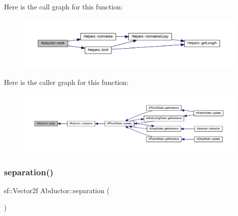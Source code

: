 Here is the call graph for this function\+:
\nopagebreak
\begin{figure}[H]
\begin{center}
\leavevmode
\includegraphics[width=350pt]{class_abductor_a2c5431c2d7afa37f9f083762eff5a995_cgraph}
\end{center}
\end{figure}
Here is the caller graph for this function\+:
\nopagebreak
\begin{figure}[H]
\begin{center}
\leavevmode
\includegraphics[width=350pt]{class_abductor_a2c5431c2d7afa37f9f083762eff5a995_icgraph}
\end{center}
\end{figure}
\mbox{\label{class_abductor_aac2bef46d63d3aa630a34ee1cb23a7f6}} 
\subsubsection{\texorpdfstring{separation()}{separation()}}
{\footnotesize\ttfamily sf\+::\+Vector2f Abductor\+::separation (\begin{DoxyParamCaption}{ }\end{DoxyParamCaption})}

